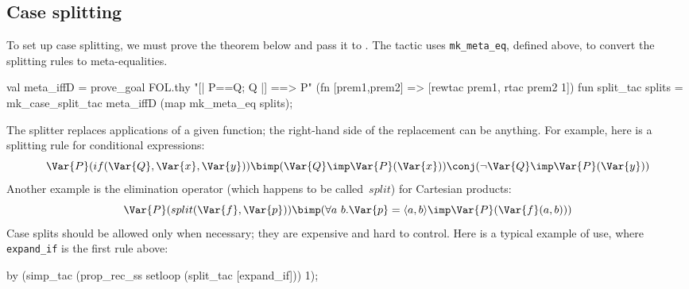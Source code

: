 \subsection{Case splitting}
To set up case splitting, we must prove the theorem below and pass it to
.  The tactic  uses
{\tt mk_meta_eq}, defined above, to convert the splitting rules to
meta-equalities.
\begin{ttbox}
val meta_iffD = 
    prove_goal FOL.thy "[| P==Q; Q |] ==> P"
        (fn [prem1,prem2] => [rewtac prem1, rtac prem2 1])
\ttbreak
fun split_tac splits =
    mk_case_split_tac meta_iffD (map mk_meta_eq splits);
\end{ttbox}
%
The splitter replaces applications of a given function; the right-hand side
of the replacement can be anything.  For example, here is a splitting rule
for conditional expressions:
\[ \Var{P}(if(\Var{Q},\Var{x},\Var{y})) \bimp (\Var{Q} \imp \Var{P}(\Var{x}))
\conj (\lnot\Var{Q} \imp \Var{P}(\Var{y})) 
\] 
Another example is the elimination operator (which happens to be
called~$split$) for Cartesian products:
\[ \Var{P}(split(\Var{f},\Var{p})) \bimp (\forall a~b. \Var{p} =
\langle a,b\rangle \imp \Var{P}(\Var{f}(a,b))) 
\] 
Case splits should be allowed only when necessary; they are expensive
and hard to control.  Here is a typical example of use, where {\tt
  expand_if} is the first rule above:
\begin{ttbox}
by (simp_tac (prop_rec_ss setloop (split_tac [expand_if])) 1);
\end{ttbox}





